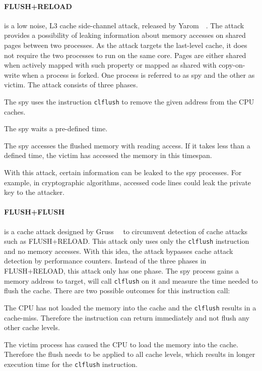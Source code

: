 \paragraph{FLUSH+RELOAD} is a low noise, L3 cache side-channel attack, released
by Yarom~\etal~\cite{flushreload}. The attack provides a possibility of leaking
information about memory accesses on shared pages between two processes. As the
attack targets the last-level cache, it does not require the two processes to
run on the same core. Pages are either shared when actively mapped with such
property or mapped as shared with copy-on-write when a process is forked. One
process is referred to as spy and the other as victim. The attack consists of
three phases.

\begin{enumerate}
\begin{samepage}
\item The spy uses the instruction \texttt{clflush} to remove the given address
from the CPU caches.
\item The spy waits a pre-defined time.
\item The spy accesses the flushed memory with reading access. If it takes less
than a defined time, the victim has accessed the memory in this timespan.
\end{samepage}
\end{enumerate}

With this attack, certain information can be leaked to the spy processes. For
example, in cryptographic algorithms, accessed code lines could leak the private
key to the attacker.

\paragraph{FLUSH+FLUSH} is a cache attack designed by
Gruss~\etal~\cite{flushflush} to circumvent detection of cache attacks such as
FLUSH+RELOAD. This attack only uses only the \texttt{clflush} instruction and no
memory accesses. With this idea, the attack bypasses cache attack detection by
performance counters. Instead of the three phases in FLUSH+RELOAD, this attack
only has one phase. The spy process gains a memory address to target, will call
\texttt{clflush} on it and measure the time needed to flush the cache. There are
two possible outcomes for this instruction call:

\begin{itemize}
\begin{samepage}
\item The CPU has not loaded the memory into the cache and the \texttt{clflush}
results in a cache-miss. Therefore the instruction can return immediately and
not flush any other cache levels.
\item The victim process has caused the CPU to load the memory into the cache.
Therefore the flush needs to be applied to all cache levels, which results in
longer execution time for the \texttt{clflush} instruction.
\end{samepage}
\end{itemize}

